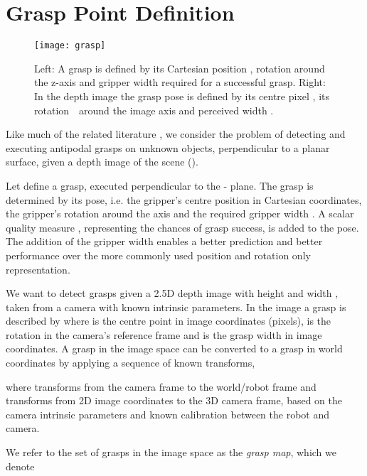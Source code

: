 \documentclass[conference]{IEEEtran}
\begin{document}
\section{Grasp Point Definition}

\begin{figure}[tpb]
    \centering
    \texttt{[image: grasp]}
    \vspace{-6mm}
    \caption{Left: A grasp  is defined by its Cartesian position , rotation around the z-axis  and gripper width  required for a successful grasp.  Right: In the depth image the grasp pose  is defined by its centre pixel , its rotation\ \  around the image axis and perceived width . 
    }
  \label{fig:problemdefinition} 
  \vspace{-6mm}
\end{figure}

Like much of the related literature \cite{Johns2016DeepUncertainty, Lenz2015DeepGrasps, Mahler2017Dex2, Pinto2016SupersizingHours, Viereck2017LearningImages}, we consider the problem of detecting and executing antipodal grasps on unknown objects, perpendicular to a planar surface, given a depth image of the scene ().

Let  define a grasp, executed perpendicular to the - plane. 
The grasp is determined by its pose, i.e. the gripper's centre position  in Cartesian coordinates, the gripper's rotation  around the  axis and the required gripper width . 
A scalar quality measure , representing the chances of grasp success, is added to the pose. 
The addition of the gripper width enables a better prediction and better performance over the more commonly used position and rotation only representation. 

We want to detect grasps given a 2.5D depth image  with height  and width , taken from a camera with known intrinsic parameters.  In the image  a grasp is described by  
where  is the centre point in image coordinates (pixels),  is the rotation in the camera's reference frame and  is the grasp width in image coordinates.  A grasp in the image space  can be converted to a grasp in world coordinates  by applying a sequence of known transforms,

where   transforms from the camera frame to the world/robot frame and  transforms from 2D image coordinates to the 3D camera frame, based on the camera intrinsic parameters and known calibration between the robot and camera. 

We refer to the set of grasps in the image space as the \textit{grasp map}, which we denote
\end{document}
